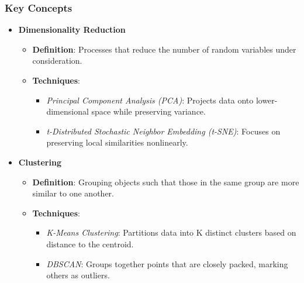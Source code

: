 \documentclass[aspectratio=169]{beamer}
\begin{document}
\begin{frame}[fragile]
    \frametitle{Key Concepts}
    \begin{itemize}
        \item \textbf{Dimensionality Reduction}
            \begin{itemize}
                \item \textbf{Definition}: Processes that reduce the number of random variables under consideration.
                \item \textbf{Techniques}:
                    \begin{itemize}
                        \item \textit{Principal Component Analysis (PCA)}: Projects data onto lower-dimensional space while preserving variance.
                        \item \textit{t-Distributed Stochastic Neighbor Embedding (t-SNE)}: Focuses on preserving local similarities nonlinearly.
                    \end{itemize}
            \end{itemize}
        \item \textbf{Clustering}
            \begin{itemize}
                \item \textbf{Definition}: Grouping objects such that those in the same group are more similar to one another.
                \item \textbf{Techniques}:
                    \begin{itemize}
                        \item \textit{K-Means Clustering}: Partitions data into K distinct clusters based on distance to the centroid.
                        \item \textit{DBSCAN}: Groups together points that are closely packed, marking others as outliers.
                    \end{itemize}
            \end{itemize}
    \end{itemize}
\end{frame}
\end{document}
